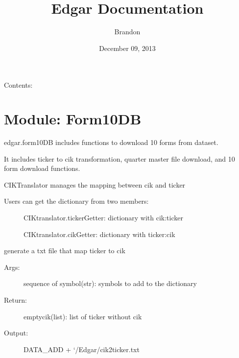 \documentclass[letterpaper,10pt,english]{sphinxmanual}
\title{Edgar Documentation}
\date{December 09, 2013}
\author{Brandon}
\begin{document}
\maketitle
\tableofcontents
{}\label{index::doc}


Contents:


\chapter{Module: Form10DB}
\label{form10DB:welcome-to-edgar-s-documentation}\label{form10DB::doc}\label{form10DB:module-form10DB}\label{form10DB:module-form10db}
edgar.form10DB includes functions to download 10 forms from dataset.

It includes ticker to cik transformation, quarter master file download, and 10 form download functions.

\begin{fulllineitems}
\label{form10DB:form10DB.CIKTranslator}
CIKTranslator manages the mapping between cik and ticker
\begin{description}
\item[{Users can get the dictionary from two members:}] \leavevmode
CIKtranslator.tickerGetter:   dictionary with cik:ticker

CIKtranslator.cikGetter:      dictionary with ticker:cik

\end{description}

\begin{fulllineitems}
\label{form10DB:form10DB.CIKTranslator.updateCIKtable}
generate a txt file that map ticker to cik
\begin{description}
\item[{Args:}] \leavevmode
sequence of symbol(str): symbols to add to the dictionary

\item[{Return:}] \leavevmode
emptycik(list): list of ticker without cik

\item[{Output:}] \leavevmode
DATA\_ADD + `/Edgar/cik2ticker.txt

\end{description}

\end{fulllineitems}


\end{fulllineitems}
\end{document}
